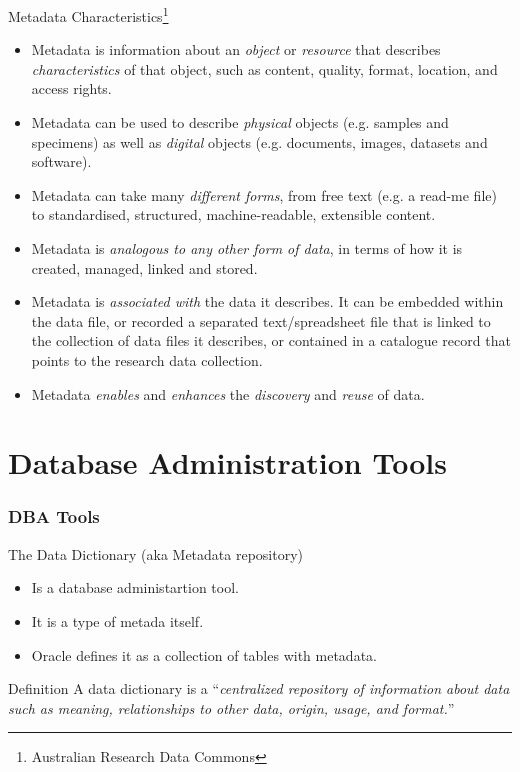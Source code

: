 \documentclass{beamer}
\begin{document}
\begin{frame}{Metadata Characteristics\footnote{Australian Research Data Commons}}
    \footnotesize
    \begin{minipage}{.49\textwidth}
        \begin{itemize}
            \item Metadata is information about an \textit{object} or \textit{resource} that describes \textit{characteristics} of that object, such as content, quality, format, location, and access rights.\pause
            \item Metadata can be used to describe \textit{physical} objects (e.g. samples and specimens) as well as \textit{digital} objects (e.g. documents, images, datasets and software).\pause
            \item Metadata can take many \textit{different forms}, from free text (e.g. a read-me file) to standardised, structured, machine-readable, extensible content.\pause
        \end{itemize}
    \end{minipage}
    \begin{minipage}{.49\textwidth}
        \begin{itemize}
            \item Metadata is \textit{analogous to any other form of data}, in terms of how it is created, managed, linked and stored.\pause
            \item Metadata is \textit{associated with} the data it describes.  It can be embedded within the data file, or recorded a separated text/spreadsheet file that is linked to the collection of data files it describes, or contained in a catalogue record that points to the research data collection.\pause
            \item Metadata \textit{enables} and \textit{enhances} the \textit{discovery} and \textit{reuse} of data.\pause
        \end{itemize}
    \end{minipage}
\end{frame}

\section{Database Administration Tools}

\begin{frame}
    \frametitle{DBA Tools}
    The Data Dictionary (aka Metadata repository)
    \begin{itemize}
        \item Is a database administartion tool.
        \item It is a type of metada itself.
        \item Oracle defines it as a collection of tables with metadata.
    \end{itemize}

    \begin{alertblock}{Definition}
        A data dictionary is a ``\textit{centralized repository of information about data such as meaning, relationships to other data, origin, usage, and format.}''
    \end{alertblock}
\end{frame}
\end{document}
